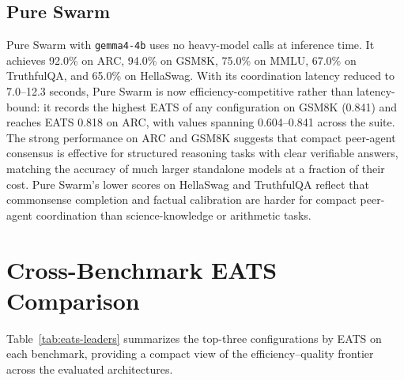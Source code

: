 \subsection{Pure Swarm}

Pure Swarm with \texttt{gemma4-4b} uses no heavy-model calls at inference time. It achieves 92.0\% on ARC, 94.0\% on GSM8K, 75.0\% on MMLU, 67.0\% on TruthfulQA, and 65.0\% on HellaSwag. With its coordination latency reduced to 7.0--12.3 seconds, Pure Swarm is now efficiency-competitive rather than latency-bound: it records the highest EATS of any configuration on GSM8K (0.841) and reaches EATS 0.818 on ARC, with values spanning 0.604--0.841 across the suite. The strong performance on ARC and GSM8K suggests that compact peer-agent consensus is effective for structured reasoning tasks with clear verifiable answers, matching the accuracy of much larger standalone models at a fraction of their cost. Pure Swarm's lower scores on HellaSwag and TruthfulQA reflect that commonsense completion and factual calibration are harder for compact peer-agent coordination than science-knowledge or arithmetic tasks.

\section{Cross-Benchmark EATS Comparison}
\label{sec:cross-bench}

Table~\ref{tab:eats-leaders} summarizes the top-three configurations by EATS on each benchmark, providing a compact view of the efficiency--quality frontier across the evaluated architectures.

